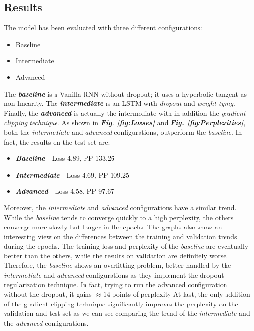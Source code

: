\subsection{Results}
The model has been evaluated with three different configurations:
\begin{itemize}
    \item Baseline
    \item Intermediate
    \item Advanced
\end{itemize}
The \textbf{\emph{baseline}} is a Vanilla RNN without dropout; it uses a hyperbolic tangent as non linearity. The \textbf{\emph{intermediate}} is an LSTM with \emph{dropout} and \emph{weight tying}. Finally, the \textbf{\emph{advanced}} is actually the intermediate with in addition the \emph{gradient clipping technique}. As shown in \textbf{\emph{Fig. \ref{fig:Losses}}} and \textbf{\emph{Fig. \ref{fig:Perplexities}}}, both the \emph{intermediate} and \emph{advanced} configurations, outperform the \emph{baseline}. In fact, the results on the test set are:
\begin{itemize}
    \item \textbf{\emph{Baseline}} - Loss 4.89, PP 133.26
    \item \textbf{\emph{Intermediate}} - Loss 4.69, PP 109.25
    \item \textbf{\emph{Advanced}} - Loss 4.58, PP 97.67
\end{itemize}
Moreover, the \emph{intermediate} and \emph{advanced} configurations have a similar trend. While the \emph{baseline} tends to converge quickly to a high perplexity, the others converge more slowly but longer in the epochs. The graphs also show an interesting view on the differences between the training and validation trends during the epochs. The training loss and perplexity of the \emph{baseline} are eventually better than the others, while the results on validation are definitely worse. Therefore, the \emph{baseline} shows an overfitting problem, better handled by the \emph{intermediate} and \emph{advanced} configurations as they implement the dropout regularization technique. In fact, trying to run the advanced configuration without the dropout, it gains $\approx14$ points of perplexity At last, the only addition of the gradient clipping technique significantly improves the perplexity on the validation and test set as we can see comparing the trend of the \emph{intermediate} and the \emph{advanced} configurations.


